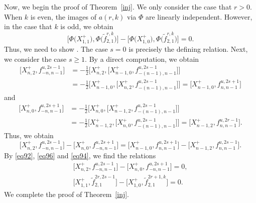 \documentclass[10pt,a4paper]{amsart}
\numberwithin{equation}{section}
\theoremstyle{definition}
\begin{document}
Now, we begin the proof of Theorem~\ref{inj}. We only consider the case that $r>0$. When $k$ is even, the images of $a(r,k)$ via $\Phi$ are linearly independent. However, in the case that $k$ is odd, we obtain
\begin{equation*}
\bigl[\Phi\bigl(X^+_{1,1}\bigr),\Phi\bigl(\widetilde{f}_{2,1}^{r,k}\bigr)\bigr]-\bigl[\Phi\bigl(X^+_{1,0}\bigr),\Phi\bigl(\widetilde{f}_{2,1}^{r,k}\bigr)\bigr]=0.
\end{equation*}
Thus, we need to show .
The case $s=0$ is precisely the defining relation.
Next, we consider the case $s\geq1$. By a direct computation, we obtain
\begin{align*}
\bigl[X^+_{n,2},f_{-n,n-1}^{u,2s-1}\bigr]&=-\frac{1}{2}\bigl[X^+_{n,2},\bigl[X^+_{n-1,0},f_{-(n-1),n-1}^{u,2s-1}\bigr]\bigr]\\
&=-\frac{1}{2}\bigl[X^+_{n-1,0},\bigl[X^+_{n,2},f_{-(n-1),n-1}^{u,2s-1}\bigr]\bigr]=\bigl[X^+_{n-1,0},f_{n,n-1}^{u,2s+1}\bigr]
\end{align*}
and
\begin{align*}
\bigl[X^+_{n,0},f_{-n,n-1}^{u,2s+1}\bigr]&=-\frac{1}{2}\bigl[X^+_{n,0},\bigl[X^+_{n-1,2},f_{-(n-1),n-1}^{u,2s-1}\bigr]\bigr]\\
&=-\frac{1}{2}\bigl[X^+_{n-1,2},\bigl[X^+_{n,0},f_{-(n-1),n-1}^{u,2s-1}\bigr]\bigr]=\bigl[X^+_{n-1,2},f_{n,n-1}^{u,2r-1}\bigr].
\end{align*}
Thus, we obtain
\begin{equation}
\bigl[X^+_{n,2},f_{-n,n-1}^{u,2s-1}\bigr]-\bigl[X^+_{n,0},f_{-n,n-1}^{u,2s+1}\bigr]=\bigl[X^+_{n-1,0},f_{n,n-1}^{u,2s+1}\bigr]-\bigl[X^+_{n-1,2},f_{n,n-1}^{u,2s-1}\bigr].\label{eq96}
\end{equation}
By \eqref{eq92}, \eqref{eq96} and \eqref{eq94}, we find the relations
\begin{gather*}
\bigl[X^+_{n,2},f_{-n,n-1}^{u,2s-1}\bigr]-\bigl[X^+_{n,0},f_{-n,n-1}^{u,2s+1}\bigr]=0,\\
\bigl[X^+_{1,1},\widetilde{f}_{2,1}^{2r,2s-1}\bigr]-\bigl[X^+_{1,0},\widetilde{f}_{2,1}^{2r+1,k}\bigr]=0.
\end{gather*}
We complete the proof of Theorem~\ref{inj}.
\end{document}
